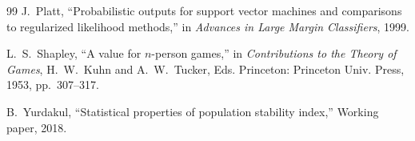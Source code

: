 \documentclass[conference]{IEEEtran}
\begin{document}
\begin{thebibliography}{99}
J.~Platt,
``Probabilistic outputs for support vector machines and comparisons
to regularized likelihood methods,''
in \emph{Advances in Large Margin Classifiers}, 1999.

L.~S.~Shapley,
``A value for $n$-person games,''
in \emph{Contributions to the Theory of Games}, H.~W.~Kuhn and
A.~W.~Tucker, Eds. Princeton: Princeton Univ. Press, 1953, pp.~307--317.

B.~Yurdakul,
``Statistical properties of population stability index,''
Working paper, 2018.

\end{thebibliography}
\end{document}
